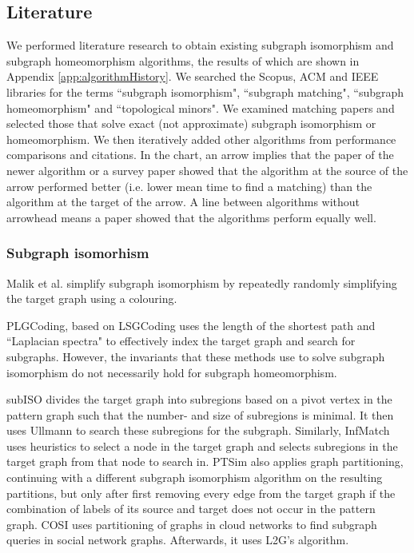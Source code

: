 \subsection{Literature}
We performed literature research to obtain existing subgraph isomorphism and subgraph homeomorphism algorithms, the results of which are shown in Appendix \ref{app:algorithmHistory}. We searched the Scopus, ACM and IEEE libraries for the terms ``subgraph isomorphism", ``subgraph matching", ``subgraph homeomorphism" and ``topological minors". We examined matching papers and selected those that solve exact (not approximate) subgraph isomorphism or homeomorphism. We then iteratively added other algorithms from performance comparisons and citations. In the chart, an arrow implies that the paper of the newer algorithm or a survey paper showed that the algorithm at the source of the arrow performed better (i.e. lower mean time to find a matching) than the algorithm at the target of the arrow. A line between algorithms without arrowhead means a paper showed that the algorithms perform equally well.	


\subsubsection{Subgraph isomorhism}

Malik et al.\cite{Malik2019} simplify subgraph isomorphism by repeatedly randomly simplifying the target graph using a colouring.

PLGCoding\cite{Zhu2019}, based on LSGCoding\cite{Zhu20111272} uses the length of the shortest path and ``Laplacian spectra" to effectively index the target graph and search for subgraphs. However, the invariants that these methods use to solve subgraph isomorphism do not necessarily hold for subgraph homeomorphism.

subISO\cite{8711459} divides the target graph into subregions based on a pivot vertex in the pattern graph such that the number- and size of subregions is minimal. It then uses Ullmann\cite{ullmann1976} to search these subregions for the subgraph. Similarly, InfMatch\cite{Ma2019} uses heuristics to select a node in the target graph and selects subregions in the target graph from that node to search in. PTSim\cite{Xie2017} also applies graph partitioning, continuing with a different subgraph isomorphism algorithm on the resulting partitions, but only after first removing every edge from the target graph if the combination of labels of its source and target does not occur in the pattern graph. COSI\cite{5562766} uses partitioning of graphs in cloud networks to find subgraph queries in social network graphs. Afterwards, it uses L2G's algorithm\cite{Almasri2015}.

